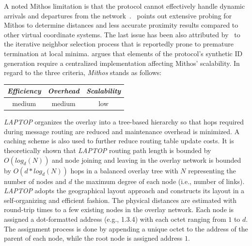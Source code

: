 A noted Mithos limitation is that the protocol cannot effectively
handle dynamic arrivals and departures from the network~\cite{RGJZ2004}. 
\cite{CCRK2004}~points out extensive probing for Mithos to determine 
distances and less accurate proximity results compared to other
virtual coordinate systems. The last issue  has been also attributed
by~\cite{WSS2005} to the iterative neighbor selection process that is 
reportedly prone to premature termination at local minima.
\cite{cox_vivaldi_2004} argues that elements of the protocol's
synthetic ID generation require a centralized implementation 
affecting Mithos' scalability.
In regard to the three criteria, \emph{Mithos} stands as follows:
\begin{center}
{\footnotesize
\begin{tabular}{ccc}
\emph{Efficiency} & \emph{Overhead} & \emph{Scalability} \\
\hline
medium &
medium &
low
\end{tabular}
}
\end{center}

%
\emph{LAPTOP} \cite{WLH2007} organizes the overlay 
into a tree-based hierarchy so that 
hops required during message routing are reduced and 
maintenance overhead is minimized.
A caching scheme is also used 
to further reduce routing table update costs. 
It is theoretically shown that 
\emph{LAPTOP} routing path length is bounded by $O(log_d(N))$ and node
joining and leaving in the overlay network is bounded by
$O(d*log_d(N))$ hops in a balanced overlay tree with $N$ representing the
number of nodes and $d$ the maximum degree of each node (i.e., number of links). 
\emph{LAPTOP} adopts the geographical layout approach  
and constructs its layout in a self-organizing and 
efficient fashion. 
The physical distances are estimated
with round-trip times to a few existing nodes in the overlay network.
Each node is assigned a dot-formatted address (e.g., 1.3.4) with
each octet ranging from $1$ to $d$.
The assignment process is done by appending a unique octet 
to the address of the parent of each node, while
the root node is assigned address $1$.

